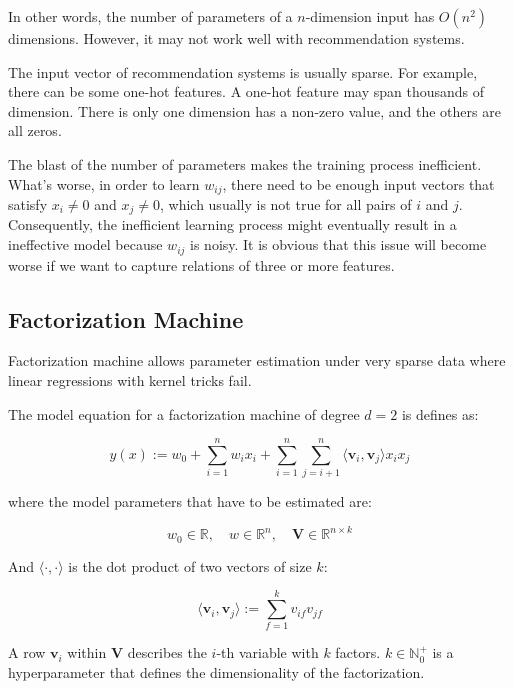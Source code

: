         In other words, the number of parameters of a $n$-dimension input has $O(n^2)$ dimensions.
        However, it may not work well with recommendation systems.

        The input vector of recommendation systems is usually sparse.
        For example, there can be some one-hot features.
        A one-hot feature may span thousands of dimension.
        There is only one dimension has a non-zero value, and the others are all zeros.

        The blast of the number of parameters makes the training process inefficient.
        What's worse, in order to learn $w_{ij}$,
        there need to be enough input vectors that satisfy $x_i \neq 0$ and $x_j \neq 0$,
        which usually is not true for all pairs of $i$ and $j$.
        Consequently, the inefficient learning process might eventually result in a ineffective model
        because $w_{ij}$ is noisy.
        It is obvious that this issue will become worse if we want to capture relations of three or more features.

    \subsection{Factorization Machine}

        Factorization machine allows parameter estimation under very sparse data
        where linear regressions with kernel tricks fail. \cite{Rendle2010}

        The model equation for a factorization machine of degree $d=2$ is defines as:

        \begin{equation}
        y(x) := w_0 + \sum_{i=1}^n w_i x_i + \sum_{i=1}^n\sum_{j=i+1}^n \langle \bm{v}_i, \bm{v}_j \rangle x_ix_j
        \label{eq:fm}
        \end{equation}

        where the model parameters that have to be estimated are:

        \[
        w_0 \in \mathbb{R}, \quad w \in \mathbb{R}^n, \quad \bm{V} \in \mathbb{R}^{n \times k}
        \]

        And $\langle \cdot, \cdot \rangle$ is the dot product of two vectors of size $k$:

        \[
        \langle \bm{v}_i, \bm{v}_j \rangle := \sum_{f=1}^k v_{if}v_{jf}
        \]

        A row $\bm{v}_i$ within $\bm{V}$ describes the $i$-th variable with $k$ factors.
        $k \in \mathbb{N}_0^+$ is a hyperparameter that defines the dimensionality of the factorization.


